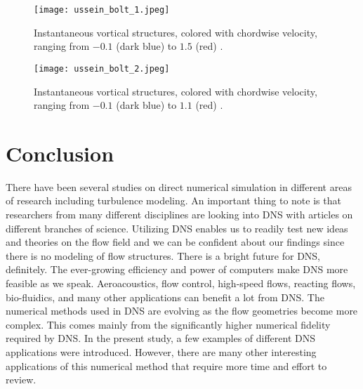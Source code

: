 \documentclass[12pt,oneside,a4paper,english]{article}
\begin{document}
\begin{figure}[H]
    \centering
    \texttt{[image: ussein\_bolt\_1.jpeg]}
    \caption[Instantaneous vortical structures]{Instantaneous vortical structures, colored with chordwise velocity, ranging from $-0.1$ (dark blue) to $1.5$ (red) \cite{hosseini2016direct}.}
    \label{fig_ussein_bolt_1}
\end{figure}

\begin{figure}[H]
    \centering
    \texttt{[image: ussein\_bolt\_2.jpeg]}
    \caption[Instantaneous vortical structures]{Instantaneous vortical structures, colored with chordwise velocity, ranging from $-0.1$ (dark blue) to $1.1$ (red) \cite{hosseini2016direct}.}
    \label{fig_ussein_bolt_2}
\end{figure}









\section{Conclusion}
There have been several studies on direct numerical simulation in different areas of research including turbulence modeling. An important thing to note is that researchers from many different disciplines are looking into DNS with articles on different branches of science. Utilizing DNS enables us to readily test new ideas and theories on the flow field and we can be confident about our findings since there is no modeling of flow structures. There is a bright future for DNS, definitely. The ever-growing efficiency and power of computers make DNS more feasible as we speak. Aeroacoustics, flow control, high-speed flows, reacting flows, bio-fluidics, and many other applications can benefit a lot from DNS. The numerical methods used in DNS are evolving as the flow geometries become more complex. This comes mainly from the significantly higher numerical fidelity required by DNS. In the present study, a few examples of different DNS applications were introduced. However, there are many other interesting applications of this numerical method that require more time and effort to review.









\newpage
{}




\label{endOfDoc}
\end{document}
